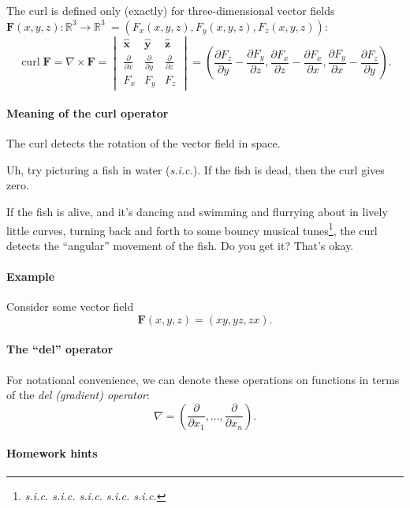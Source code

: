 \documentclass[11pt]{article}
\newcommand{\uvec}[1]{\bm{\hat{#1}}}
\renewcommand{\vec}[1]{\bm{#1}}
\newcommand{\real}{\mathbb R}
\DeclareMathOperator{\curl}{curl}
\begin{document}
The curl is defined only (exactly) for three-dimensional vector fields \(\vec F(x, y, z) \colon \real^3 \to \real^3\ = (F_x(x, y, z), F_y(x, y, z), F_z(x, y, z))\):
\[
    \curl \vec F = \nabla \times \vec F =
    \begin{vmatrix}
        \uvec x & \uvec y & \uvec z \\
        \frac{\partial}{\partial x} & \frac{\partial}{\partial y} & \frac{\partial}{\partial z} \\
        F_x & F_y & F_z
    \end{vmatrix}
    =
    \left(\frac{\partial F_z}{\partial y} - \frac{\partial F_y}{\partial z},
          \frac{\partial F_x}{\partial z} - \frac{\partial F_x}{\partial x},
          \frac{\partial F_y}{\partial x} - \frac{\partial F_z}{\partial y}\right).
\]

\paragraph{Meaning of the curl operator}

The curl detects the rotation of the vector field in space.

Uh, try picturing a fish in water (\emph{s.i.c.}). If the fish is dead, then the curl gives zero.

If the fish is alive, and it's dancing and swimming and flurrying about in lively little curves, turning back and forth to some bouncy musical tunes\footnote{\emph{s.i.c. \scriptsize s.i.c. \tiny s.i.c. s.i.c. s.i.c.}}, the curl detects the ``angular'' movement of the fish. Do you get it? That's okay.


\paragraph{Example}

Consider some vector field
\[
    \vec F(x, y, z) = (xy, yz, zx).
\]


\paragraph{The ``del'' operator}

For notational convenience, we can denote these operations on functions in terms of the \emph{del (gradient) operator}:
\[
    \nabla = \left(\frac{\partial}{\partial x_1}, \dots, \frac{\partial}{\partial x_n}\right).
\]

\paragraph{Homework hints}
\end{document}
